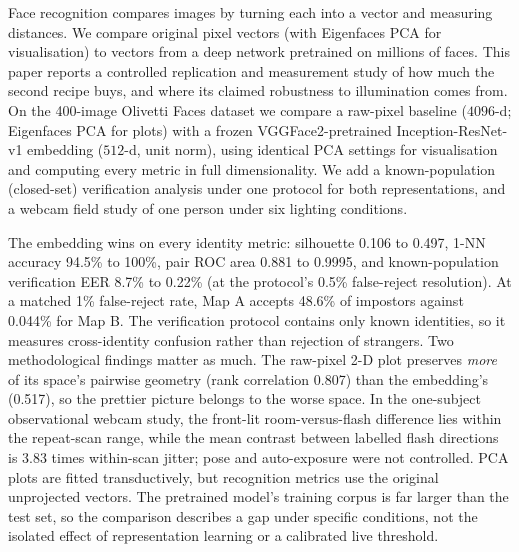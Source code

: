Face recognition compares images by turning each into a vector and measuring distances. We compare original pixel vectors (with Eigenfaces PCA for visualisation) to vectors from a deep network pretrained on millions of faces. This paper reports a controlled replication and measurement study of how much the second recipe buys, and where its claimed robustness to illumination comes from. On the 400-image Olivetti Faces dataset we compare a raw-pixel baseline ($4096$-d; Eigenfaces PCA for plots) with a frozen VGGFace2-pretrained Inception-ResNet-v1 embedding ($512$-d, unit norm), using identical PCA settings for visualisation and computing every metric in full dimensionality. We add a known-population (closed-set) verification analysis under one protocol for both representations, and a webcam field study of one person under six lighting conditions.

The embedding wins on every identity metric: silhouette 0.106 to 0.497, 1-NN accuracy 94.5\% to 100\%, pair ROC area 0.881 to 0.9995, and known-population verification EER 8.7\% to 0.22\% (at the protocol's 0.5\% false-reject resolution). At a matched 1\% false-reject rate, Map A accepts 48.6\% of impostors against 0.044\% for Map B. The verification protocol contains only known identities, so it measures cross-identity confusion rather than rejection of strangers. Two methodological findings matter as much. The raw-pixel 2-D plot preserves \emph{more} of its space's pairwise geometry (rank correlation 0.807) than the embedding's (0.517), so the prettier picture belongs to the worse space. In the one-subject observational webcam study, the front-lit room-versus-flash difference lies within the repeat-scan range, while the mean contrast between labelled flash directions is 3.83 times within-scan jitter; pose and auto-exposure were not controlled. PCA plots are fitted transductively, but recognition metrics use the original unprojected vectors. The pretrained model's training corpus is far larger than the test set, so the comparison describes a gap under specific conditions, not the isolated effect of representation learning or a calibrated live threshold.
